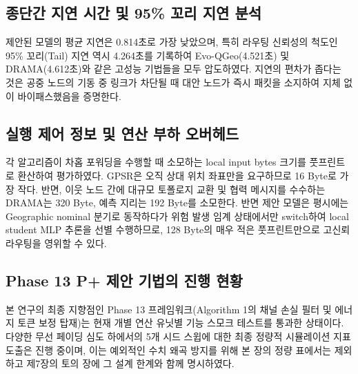 \subsection{종단간 지연 시간 및 95\% 꼬리 지연 분석}
제안된 \phaseTwelve{} 모델의 평균 지연은 0.814초로 가장 낮았으며, 특히 라우팅 신뢰성의 척도인 95\% 꼬리(Tail) 지연 역시 4.264초를 기록하여 Evo-QGeo(4.521초) 및 DRAMA(4.612초)와 같은 고성능 기법들을 모두 압도하였다. 지연의 편차가 좁다는 것은 공중 노드의 기동 중 링크가 차단될 때 대안 노드가 즉시 패킷을 소지하여 지체 없이 바이패스했음을 증명한다.

\subsection{실행 제어 정보 및 연산 부하 오버헤드}
각 알고리즘이 차홉 포워딩을 수행할 때 소모하는 local input bytes 크기를 풋프린트로 환산하여 평가하였다. GPSR은 오직 상대 위치 좌표만을 요구하므로 16 Byte로 가장 작다. 반면, 이웃 노드 간에 대규모 토폴로지 교환 및 협력 메시지를 수수하는 DRAMA는 320 Byte, 예측 지리는 192 Byte를 소모한다. 반면 제안 모델은 평시에는 Geographic nominal 분기로 동작하다가 위험 발생 임계 상태에서만 switch하여 local student MLP 추론을 선별 수행하므로, 128 Byte의 매우 적은 풋프린트만으로 고신뢰 라우팅을 영위할 수 있다.

\subsection{Phase 13 P+ 제안 기법의 진행 현황}
본 연구의 최종 지향점인 Phase 13 \method{} 프레임워크(Algorithm 1의 채널 손실 필터 및 에너지 토큰 보정 탑재)는 현재 개별 연산 유닛별 기능 스모크 테스트를 통과한 상태이다. 다양한 무선 페이딩 심도 하에서의 5개 시드 스윕에 대한 최종 정량적 시뮬레이션 지표 도출은 진행 중이며, 이는 예외적인 수치 왜곡 방지를 위해 본 장의 정량 표에서는 제외하고 제7장의 토의 장에 그 설계 한계와 함께 명시하였다.
